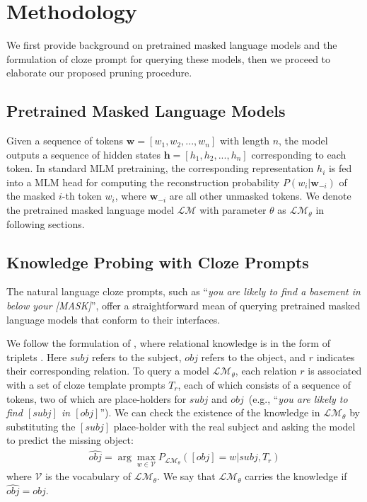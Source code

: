 \section{Methodology}
We first provide background on pretrained masked language models and the formulation of cloze prompt for querying these models, then we proceed to 
elaborate our proposed pruning procedure.
\subsection{Pretrained Masked Language Models}
\label{sec:PLMs}
Given a sequence of tokens $\bm{w}=[w_1, w_2, ..., w_n]$ with length $n$, the model outputs a sequence of hidden states $\bm{h}=[h_1, h_2, ..., h_n]$ corresponding to each token. In standard MLM pretraining, the corresponding representation $h_{i}$ is fed into a  MLM head for computing the reconstruction probability $P(w_{i}|\bm{w}_{-i})$ of the masked $i$-th token $w_{i}$, where 
$\bm{w}_{-i}$ are all other unmasked tokens. We denote the pretrained masked language model 
$\mathcal{LM}$ with parameter $\theta$ as $\mathcal{LM}_{\theta}$ in following sections.
\subsection{Knowledge Probing with Cloze Prompts}
The natural language cloze prompts, such as ``\textit{you are likely to find a basement in below your [MASK]}'', offer a straightforward mean
of querying pretrained masked language models that conform to their interfaces.

We follow the formulation of \citet{Petroni2020}, where relational knowledge is in the form of triplets . 
Here $subj$ refers to the subject, $obj$ refers to the object, 
and $r$ indicates their corresponding relation. To query a model 
$\mathcal{LM}_{\theta}$, each relation $r$ is associated with a set of 
cloze template prompts $T_r$, each of which consists of a sequence of 
tokens, two of which are place-holders for $subj$ and $obj$~(e.g., ``\textit{you are likely to find $[subj]$ in $[obj]$}''). We can
check the existence of the knowledge in $\mathcal{LM}_\theta$ by 
substituting the $[subj]$ place-holder with the 
real subject and asking the model to predict the missing object:
\begin{align}\nonumber
\hat{obj}=\arg \max_{w\in \mathcal{V}}P_{\mathcal{LM}_\theta}([obj]=w|subj, T_r)
\end{align}
where $\mathcal{V}$ is the vocabulary of $\mathcal{LM}_\theta$. We say that $\mathcal{LM}_\theta$ 
carries the knowledge if $\hat{obj}=obj$.

